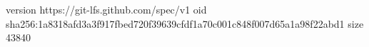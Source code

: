 version https://git-lfs.github.com/spec/v1
oid sha256:1a8318afd3a3f917fbed720f39639cfdf1a70c001c848f007d65a1a98f22abd1
size 43840
